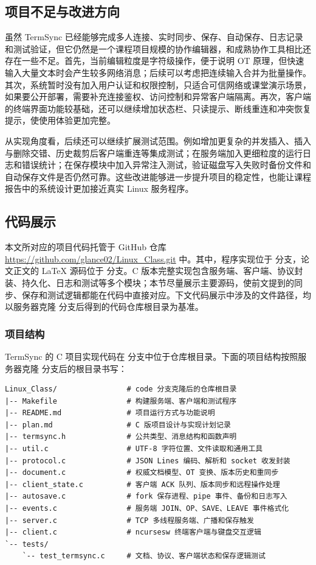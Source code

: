 \newpage
\subsection{项目不足与改进方向}

虽然 TermSync 已经能够完成多人连接、实时同步、保存、自动保存、日志记录和测试验证，但它仍然是一个课程项目规模的协作编辑器，和成熟协作工具相比还存在一些不足。首先，当前编辑粒度是字符级操作，便于说明 OT 原理，但快速输入大量文本时会产生较多网络消息；后续可以考虑把连续输入合并为批量操作。其次，系统暂时没有加入用户认证和权限控制，只适合可信网络或课堂演示场景，如果要公开部署，需要补充连接鉴权、访问控制和异常客户端隔离。再次，客户端的终端界面功能较基础，还可以继续增加状态栏、只读提示、断线重连和冲突恢复提示，使使用体验更加完整。

从实现角度看，后续还可以继续扩展测试范围。例如增加更复杂的并发插入、插入与删除交错、历史裁剪后客户端重连等集成测试；在服务端加入更细粒度的运行日志和错误统计；在保存模块中加入异常注入测试，验证磁盘写入失败时备份文件和自动保存文件是否仍然可靠。这些改进能够进一步提升项目的稳定性，也能让课程报告中的系统设计更加接近真实 Linux 服务程序。

\newpage
\subsection{代码展示}

本文所对应的项目代码托管于 GitHub 仓库 \url{https://github.com/glance02/Linux_Class.git} 中。其中，程序实现位于  分支，论文正文的 LaTeX 源码位于  分支。C 版本完整实现包含服务端、客户端、协议封装、持久化、日志和测试等多个模块；本节尽量展示主要源码，使前文提到的同步、保存和测试逻辑都能在代码中直接对应。下文代码展示中涉及的文件路径，均以服务器克隆  分支后得到的代码仓库根目录为基准。

\subsubsection{项目结构}

TermSync 的 C 项目实现代码在  分支中位于仓库根目录。下面的项目结构按照服务器克隆  分支后的根目录书写：

\begin{verbatim}
Linux_Class/                # code 分支克隆后的仓库根目录
|-- Makefile                # 构建服务端、客户端和测试程序
|-- README.md               # 项目运行方式与功能说明
|-- plan.md                 # C 版项目设计与实现计划记录
|-- termsync.h              # 公共类型、消息结构和函数声明
|-- util.c                  # UTF-8 字符位置、文件读取和通用工具
|-- protocol.c              # JSON Lines 编码、解析和 socket 收发封装
|-- document.c              # 权威文档模型、OT 变换、版本历史和重同步
|-- client_state.c          # 客户端 ACK 队列、版本同步和远程操作处理
|-- autosave.c              # fork 保存进程、pipe 事件、备份和日志写入
|-- events.c                # 服务端 JOIN、OP、SAVE、LEAVE 事件格式化
|-- server.c                # TCP 多线程服务端、广播和保存触发
|-- client.c                # ncursesw 终端客户端与键盘交互逻辑
`-- tests/
    `-- test_termsync.c     # 文档、协议、客户端状态和保存逻辑测试
\end{verbatim}

